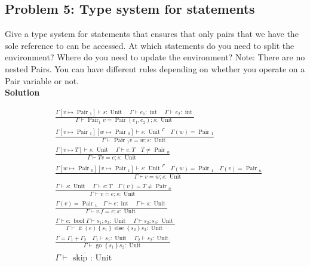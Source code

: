 \subsection{Problem 5: Type system for statements}

Give a type system for statements that ensures that only pairs that we have the
sole reference to can be accessed. At which statements do you need to split the environment?
Where do you need to update the environment?
Note: There are no nested Pairs. You can have different rules depending on whether you operate on a Pair variable or not. \\

\textbf{Solution}

\[
\begin{aligned}
    & \frac{\Gamma\left[v \mapsto \text { Pair }_1\right] \vdash s: \text { Unit } \quad \Gamma \vdash e_1: \text { int } \quad \Gamma \vdash e_2: \text { int }}{\Gamma \vdash \operatorname{Pair}_1 v=\operatorname{Pair}\left(e_1, e_2\right) ; s: \text { Unit }} \\
    & \frac{\Gamma\left[v \mapsto \text { Pair }_1\right]\left[w \mapsto \text { Pair }_0\right] \vdash s: \text { Unit }^{\Gamma} \quad \Gamma(w)=\text { Pair }_1}{\Gamma \vdash \text { Pair }_1 v=w ; s: \text { Unit }} \\
    & \frac{\Gamma[v \mapsto T] \vdash s: \text { Unit } \quad \Gamma \vdash e: T \quad T \neq \text { Pair }_n}{\Gamma \vdash T v=e ; s: \text { Unit }} \\
    & \frac{\Gamma\left[w \mapsto \text { Pair }_0\right]\left[v \mapsto \text { Pair }_1\right] \vdash s: \text { Unit }^{\Gamma} \quad \Gamma(w)=\text { Pair }_1 \quad \Gamma(v)=\text { Pair }_n}{\Gamma \vdash v=w ; s: \text { Unit }} \\
    & \frac{\Gamma \vdash s: \text { Unit } \quad \Gamma \vdash e: T \quad \Gamma(v)=T \neq \text { Pair }_n}{\Gamma \vdash v=e ; s: \text { Unit }} \\
    & \frac{\Gamma(v)=\text { Pair }_1 \quad \Gamma \vdash e: \text { int } \quad \Gamma \vdash s: \text { Unit }}{\Gamma \vdash v . f=e ; s: \text { Unit }} \\
    & \frac{\Gamma \vdash e: \text { bool } \Gamma \vdash s_1 ; s_3: \text { Unit } \quad \Gamma \vdash s_2 ; s_3: \text { Unit }}{\Gamma \vdash \text { if }(e)\left\{s_1\right\} \text { else }\left\{s_2\right\} s_3: \text { Unit }} \\
    & \frac{\Gamma=\Gamma_1+\Gamma_2 \quad \Gamma_1 \vdash s_1: \text { Unit } \quad \Gamma_2 \vdash s_2: \text { Unit }}{\Gamma \vdash \text { go }\left\{s_1\right\} s_2: \text { Unit }} \\
    & \overline{\Gamma \vdash \text { skip : Unit }}
\end{aligned}
\]


